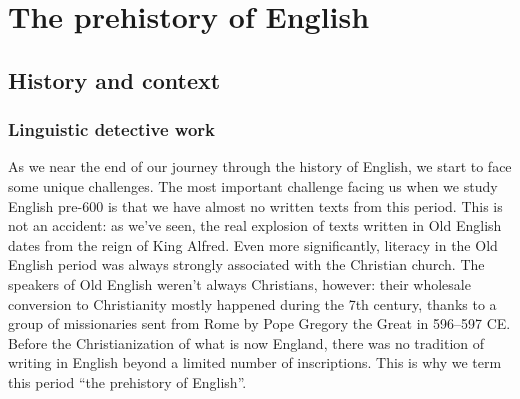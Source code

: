 \chapter{The prehistory of English}\label{prehistory}

\section{History and context}\label{history-and-context}
\subsection{Linguistic detective work}\label{prehistory-reconstruction}
\largerpage[2]
As we near the end of our journey through the history of English, we start to face some unique challenges. The most important challenge facing us when we study English pre-600 is that we have almost no written texts from this period. This is not an accident: as we've seen, the real explosion of texts written in Old English dates from the reign of King Alfred. Even more significantly, literacy in the Old English period was always strongly associated with the Christian church. The speakers of Old English weren't always Christians, however: their wholesale conversion to Christianity mostly happened during the 7th century, thanks to a group of missionaries sent from Rome by Pope Gregory the Great in 596--597 CE. Before the Christianization of what is now England, there was no tradition of writing in English beyond a limited number of inscriptions. This is why we term this period ``the prehistory of English''.

